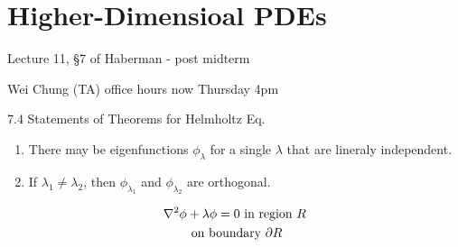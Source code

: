 \chapter{Higher-Dimensioal PDEs}

Lecture 11, \S 7 of Haberman - post midterm

Wei Chung (TA) office hours now Thursday \@ 4pm

7.4 Statements of Theorems for Helmholtz Eq. 

\begin{enumerate}
  \item There may be eigenfunctions $\phi_\lambda$ for a single $\lambda$ that are lineraly independent.
  \item If $\lambda_1 \neq \lambda_2$, then $\phi_{\lambda_1}$ and $\phi_{\lambda_2}$ are orthogonal. 
\end{enumerate}
\begin{gather*}
  \laplacian \phi + \lambda \phi = 0 \text{ in region }R \\
  \text{ on boundary }\partial R \\
\end{gather*}


